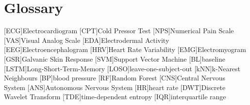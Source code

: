 \chapter{Glossary}

\footnotesize
\SingleSpacing

\begin{acronym}[AAAAAA]

	[ECG]{Electrocardiogram}
	[CPT]{Cold Pressor Test}
	[NPS]{Numerical Pain Scale}
	[VAS]{Visual Analog Scale}
	[EDA]{Electrodermal Activity}
	[EEG]{Electroencephalogram}
	[HRV]{Heart Rate Variability}
	[EMG]{Electromyogram}
	[GSR]{Galvanic Skin Response}
	[SVM]{Support Vector Machine}
	[BL]{baseline}
	[LSTM]{Long-Short-Term-Memory}
	[LOSO]{leave-one-subject-out}
	[kNN]{k-Nearest Neighbours}
	[BP]{blood pressure}
	[RF]{Random Forest}
	[CNS]{Central Nervous System}
	[ANS]{Autonomous Nervous System}
	[HR]{heart rate}
	[DWT]{Discrete Wavelet Transform}
	[TDE]{time-dependent entropy}
	[IQR]{interquartile range}

\end{acronym}

